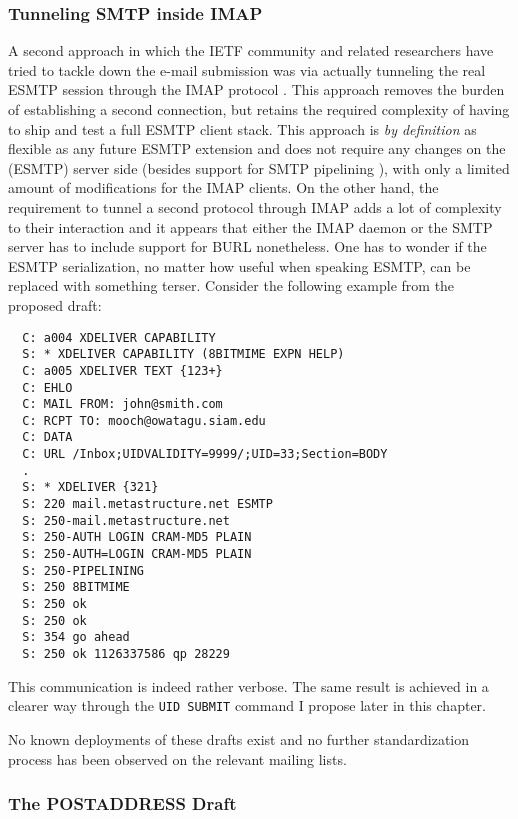 \documentclass[trojita]{subfiles}
\begin{document}
\subsubsection{Tunneling SMTP inside IMAP}

A second approach in which the IETF community and related researchers have tried to tackle down the e-mail submission
was via actually tunneling the real ESMTP session through the IMAP protocol \cite[p. 30]{draft-maes-lemonade-p-imap}.
This approach removes the burden of establishing a second connection, but retains the required complexity of having to
ship and test a full ESMTP client stack.  This approach is {\em by definition} as flexible as any future ESMTP extension
and does not require any changes on the (ESMTP) server side (besides support for SMTP pipelining \cite{rfc2920}), with
only a limited amount of modifications for the IMAP clients.  On the other hand, the requirement to tunnel a second
protocol through IMAP adds a lot of complexity to their interaction and it appears that either the IMAP daemon or the
SMTP server has to include support for BURL nonetheless.  One has to wonder if the ESMTP serialization, no matter how
useful when speaking ESMTP, can be replaced with something terser.  Consider the following example from the proposed
draft:

\begin{verbatim}
  C: a004 XDELIVER CAPABILITY
  S: * XDELIVER CAPABILITY (8BITMIME EXPN HELP)
  C: a005 XDELIVER TEXT {123+}
  C: EHLO
  C: MAIL FROM: john@smith.com
  C: RCPT TO: mooch@owatagu.siam.edu
  C: DATA
  C: URL /Inbox;UIDVALIDITY=9999/;UID=33;Section=BODY
  .
  S: * XDELIVER {321}
  S: 220 mail.metastructure.net ESMTP
  S: 250-mail.metastructure.net
  S: 250-AUTH LOGIN CRAM-MD5 PLAIN
  S: 250-AUTH=LOGIN CRAM-MD5 PLAIN
  S: 250-PIPELINING
  S: 250 8BITMIME
  S: 250 ok
  S: 250 ok
  S: 354 go ahead
  S: 250 ok 1126337586 qp 28229
\end{verbatim}

This communication is indeed rather verbose.  The same result is achieved in a clearer way through the {\tt UID SUBMIT}
command I propose later in this chapter.

No known deployments of these drafts exist and no further standardization process has been observed on the relevant
mailing lists.

\subsubsection{The POSTADDRESS Draft}
\end{document}
